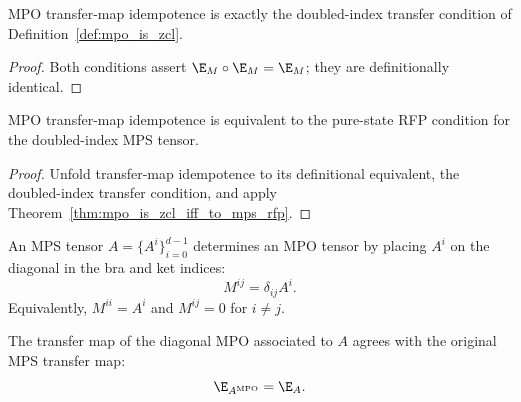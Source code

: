 \begin{theorem}
    \label{thm:is_rfp_iff_is_zcl}
    \leanok
    MPO transfer-map idempotence is exactly the doubled-index transfer
    condition of Definition~\ref{def:mpo_is_zcl}.
\end{theorem}

\begin{proof}
    \leanok
    Both conditions assert $\E_M \circ \E_M = \E_M$; they are definitionally
    identical.
\end{proof}

\begin{theorem}
    \label{thm:is_rfp_iff_to_mps_rfp}
    \leanok
    MPO transfer-map idempotence is equivalent to the pure-state RFP condition
    for the doubled-index MPS tensor.
\end{theorem}

\begin{proof}
    \leanok
    Unfold transfer-map idempotence to its definitional equivalent, the
    doubled-index transfer condition, and apply
    Theorem~\ref{thm:mpo_is_zcl_iff_to_mps_rfp}.
\end{proof}

\begin{definition}\label{def:to_mpo_tensor}
    \leanok
    An MPS tensor $A = \{A^i\}_{i=0}^{d-1}$ determines an MPO tensor by
    placing $A^i$ on the diagonal in the bra and ket indices:
    \[
        M^{ij} = \delta_{ij} A^i.
    \]
    Equivalently, $M^{ii} = A^i$ and $M^{ij} = 0$ for $i \ne j$.
\end{definition}

\begin{theorem}%
    \label{thm:to_mpo_transfer_map}
    \leanok
    The transfer map of the diagonal MPO associated to $A$ agrees with the
    original MPS transfer map:
    \[
        \E_{A^{\mathrm{MPO}}} = \E_A.
    \]
\end{theorem}

